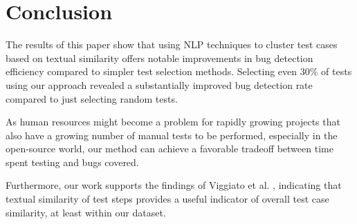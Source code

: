 \section{Conclusion}
\label{sec:conclusion}

The results of this paper show that using NLP techniques to cluster test cases based on textual similarity offers notable improvements in bug detection efficiency compared to simpler test selection methods. Selecting even 30\% of tests using our approach revealed a substantially improved bug detection rate compared to just selecting random tests. 

As human resources might become a problem for rapidly growing projects that also have a growing number of manual tests to be performed, especially in the open-source world, our method can achieve a favorable tradeoff between time spent testing and bugs covered.

Furthermore,  our work supports the findings of Viggiato et al. \cite{Viggiato}, indicating that textual similarity of test steps provides a useful indicator of overall test case similarity, at least within our dataset.
